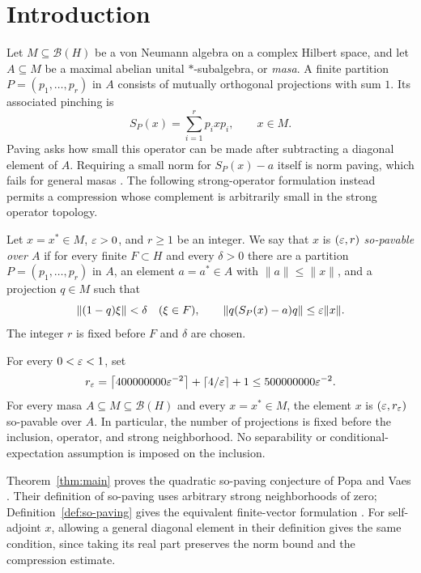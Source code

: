 \section{Introduction}\label{sec:introduction}

Let $M\subseteq\mathcal B(H)$ be a von Neumann algebra on a complex Hilbert space, and let $A\subseteq M$ be a maximal abelian unital $*$-subalgebra, or \emph{masa}. A finite partition $P=(p_1,\ldots,p_r)$ in $A$ consists of mutually orthogonal projections with sum $1$. Its associated pinching is
\[
 S_P(x)=\sum_{i=1}^r p_i x p_i,\qquad x\in M.
\]
Paving asks how small this operator can be made after subtracting a diagonal element of $A$. Requiring a small norm for $S_P(x)-a$ itself is norm paving, which fails for general masas \cite[Theorem~3.3]{PV15}. The following strong-operator formulation instead permits a compression whose complement is arbitrarily small in the strong operator topology.

\begin{definition}\label{def:so-paving}
Let $x=x^*\in M$, $\varepsilon>0$, and $r\ge1$ be an integer. We say that $x$ is \emph{$(\varepsilon,r)$ so-pavable over $A$} if for every finite $F\subset H$ and every $\delta>0$ there are a partition $P=(p_1,\ldots,p_r)$ in $A$, an element $a=a^*\in A$ with $\|a\|\le\|x\|$, and a projection $q\in M$ such that
\[
 \|(1-q)\xi\|<\delta\quad(\xi\in F),
 \qquad \|q(S_P(x)-a)q\|\le\varepsilon\|x\|.
\]
The integer $r$ is fixed before $F$ and $\delta$ are chosen.
\end{definition}

\begin{theorem}\label{thm:main}
For every $0<\varepsilon<1$, set
\[
 r_\varepsilon=\left\lceil400000000\varepsilon^{-2}\right\rceil
              +\left\lceil4/\varepsilon\right\rceil+1
          \le500000000\varepsilon^{-2}.
\]
For every masa $A\subseteq M\subseteq\mathcal B(H)$ and every $x=x^*\in M$, the element $x$ is $(\varepsilon,r_\varepsilon)$ so-pavable over $A$. In particular, the number of projections is fixed before the inclusion, operator, and strong neighborhood. No separability or conditional-expectation assumption is imposed on the inclusion.
\end{theorem}

Theorem~\ref{thm:main} proves the quadratic so-paving conjecture of Popa and Vaes \cite[Conjecture~2.8(2)]{PV15}. Their definition of so-paving uses arbitrary strong neighborhoods of zero; Definition~\ref{def:so-paving} gives the equivalent finite-vector formulation \cite[Definition~2.2]{PV15}. For self-adjoint $x$, allowing a general diagonal element in their definition gives the same condition, since taking its real part preserves the norm bound and the compression estimate.

